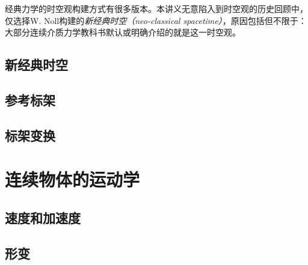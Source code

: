 \documentclass[zihao=-4,linespread=1.5,a4paper,heading=true,twoside]{ctexbook}
\theoremstyle{definition}
\theoremstyle{plain}
\begin{document}
经典力学的时空观构建方式有很多版本\cite{Weatherall2022}。本讲义无意陷入到时空观的历史回顾中，仅选择W. Noll\cite{Noll1973}构建的\emph{新经典时空（neo-classical spacetime）}，原因包括但不限于：大部分连续介质力学教科书默认或明确介绍的就是这一时空观。
\section{新经典时空}\label{sec:III.5.1}

\section{参考标架}\label{sec:III.5.2}

\section{标架变换}\label{sec:III.5.3}


\chapter{连续物体的运动学}\label{sec:III.6}
\section{速度和加速度}\label{sec:III.6.1}

\section{形变}\label{sec:III.6.2}




%

%

%

%
\end{document}
